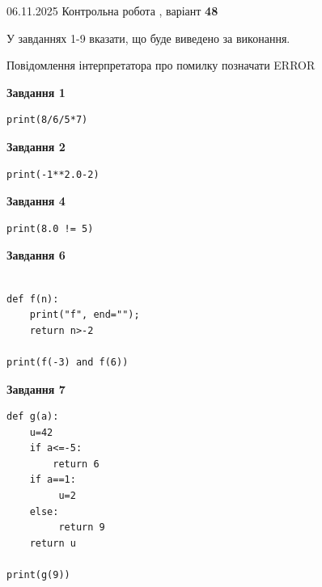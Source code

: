 \documentclass[12pt, ukrainian]{article}
\begin{document}
{\Large{06.11.2025 Контрольна робота , варіант  \No \textbf { 48 }\par}}
{
\begin {large}
У завданнях 1-9 вказати, що буде виведено за виконання.

Повідомлення інтерпретатора про помилку позначати ERROR

\begin{minipage}[t]{7.5cm}

\begin{center}
\textbf{Завдання 1}
\end{center}

\begin{verbatim}
print(8/6/5*7)
\end{verbatim}



\begin{center}
\textbf{Завдання 2}
\end{center}

\begin{verbatim}
print(-1**2.0-2)
\end{verbatim}



\begin{center}
\textbf{Завдання 4}
\end{center}

\begin{verbatim}
print(8.0 != 5)
\end{verbatim}



\begin{center}
\textbf{Завдання 6}
\end{center}

\begin{verbatim}

def f(n):
    print("f", end="");
    return n>-2

print(f(-3) and f(6))
\end{verbatim}



\begin{center}
\textbf{Завдання 7}
\end{center}

\begin{verbatim}
def g(a):
    u=42
    if a<=-5: 
        return 6
    if a==1:
         u=2
    else:
         return 9
    return u

print(g(9))
\end{verbatim}


\end{minipage}
\end{large}}
\end{document}
